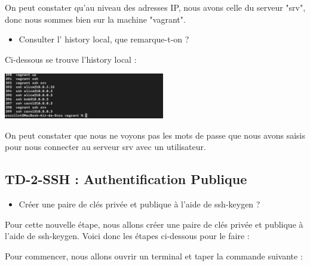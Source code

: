\documentclass[12pt]{article}
\begin{document}
\vspace{0.3cm}

On peut constater qu'au niveau des adresses IP, nous avons celle du serveur "srv", donc nous sommes bien sur la machine "vagrant".

\vspace{0.3cm}

\begin{itemize}
  \item Consulter l' history local, que remarque-t-on ?
\end{itemize}

\vspace{0.3cm}

Ci-dessous se trouve l'history local : 

\vspace{0.3cm}

\begin{center}
  \includegraphics[width=7cm]{Images-Client-SSH/Image-TD-SSH-1/History-Local.png}
\end{center}

\vspace{0.3cm}

On peut constater que nous ne voyons pas les mots de passe que nous avons saisis pour nous connecter au serveur srv avec un utilisateur.


\subsection{TD-2-SSH : Authentification Publique}

\vspace{0.3cm}

\begin{itemize}
  \item Créer une paire de clés privée et publique à l'aide de ssh-keygen ?
\end{itemize}

Pour cette nouvelle étape, nous allons créer une paire de clés privée et publique à l'aide de ssh-keygen. Voici donc les étapes ci-dessous pour le faire :

\vspace{0.3cm}

Pour commencer, nous allons ouvrir un terminal et taper la commande suivante :
\end{document}
